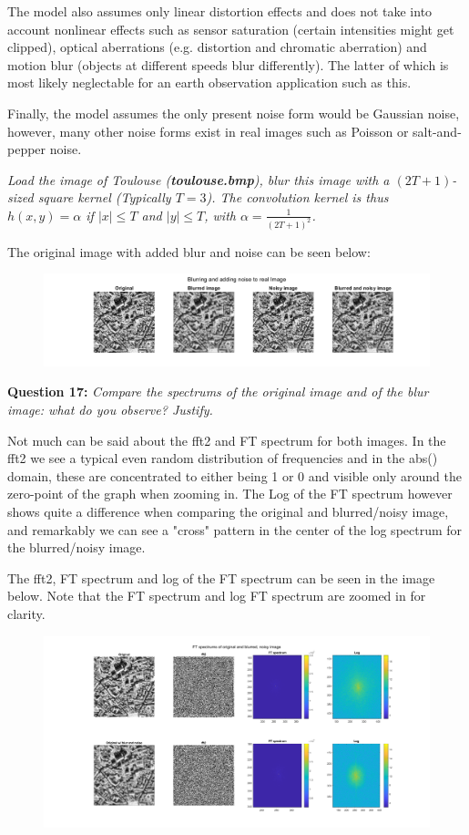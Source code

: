 The model also assumes only linear distortion effects and does not take into account nonlinear effects such as sensor saturation (certain intensities might get clipped), optical aberrations (e.g. distortion and chromatic aberration) and motion blur (objects at different speeds blur differently). The latter of which is most likely neglectable for an earth observation application such as this.

Finally, the model assumes the only present noise form would be Gaussian noise, however, many other noise forms exist in real images such as Poisson or salt-and-pepper noise.

\textit{Load the image of Toulouse (\textbf{toulouse.bmp}), blur this image with a $(2T+1)$-sized square kernel (Typically $T = 3$). The convolution kernel is thus $h(x,y) = \alpha$ if $|x| \leq T$ and $|y| \leq T$, with $\alpha = \frac{1}{(2T+1)^2}$.
}

The original image with added blur and noise can be seen below:

\begin{figure}[H]
    \centering
    \includegraphics[width=1\linewidth]{Doc/Graphics/Part1/Q16.png}
\end{figure}



\textbf{Question 17:}
\textit{Compare the spectrums of the original image and of the blur image: what do you observe? Justify.}

Not much can be said about the fft2 and FT spectrum for both images. In the fft2 we see a typical even random distribution of frequencies and in the abs() domain, these are concentrated to either being 1 or 0 and visible only around the zero-point of the graph when zooming in. The Log of the FT spectrum however shows quite a difference when comparing the original and blurred/noisy image, and remarkably we can see a "cross" pattern in the center of the log spectrum for the blurred/noisy image.

The fft2, FT spectrum and log of the FT spectrum can be seen in the image below.
Note that the FT spectrum and log FT spectrum are zoomed in for clarity.


\begin{figure}[H]
    \centering
    \includegraphics[width=0.75\linewidth]{Doc/Graphics/Part1/Q17a.png}
\end{figure}

